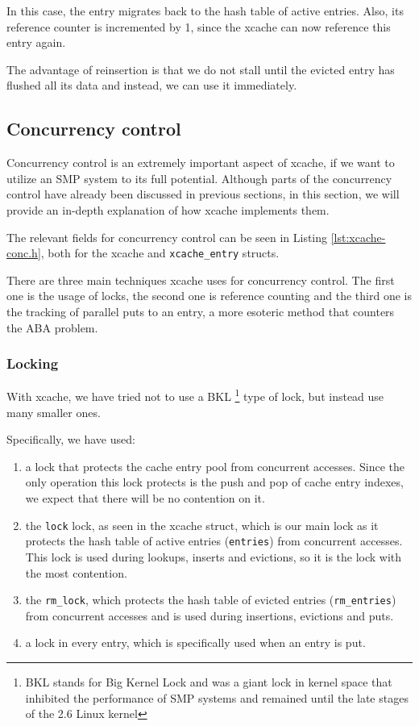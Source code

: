 In this case, the entry migrates back to the hash table of active entries.  
Also, its reference counter is incremented by 1, since the xcache can now 
reference this entry again.

The advantage of reinsertion is that we do not stall until the evicted entry 
has flushed all its data and instead, we can use it immediately.

\subsection{Concurrency control}\label{sec:xcache-conc-imp}

Concurrency control is an extremely important aspect of xcache, if we want to 
utilize an SMP system to its full potential. Although parts of the concurrency 
control have already been discussed in previous sections, in this section, we 
will provide an in-depth explanation of how xcache implements them.

The relevant fields for concurrency control can be seen in Listing 
\ref{lst:xcache-conc.h}, both for the xcache and \texttt{xcache\_entry} 
structs.


There are three main techniques xcache uses for concurrency control. The first 
one is the usage of locks, the second one is reference counting and the third 
one is the tracking of parallel puts to an entry, a more esoteric method that 
counters the ABA problem.

\subsubsection{Locking}\label{sec:xcache-lock-imp}

With xcache, we have tried not to use a BKL
\footnote{BKL stands for Big Kernel Lock and was a giant lock in kernel space 
	that inhibited the performance of SMP systems and remained until the 
	late stages of the 2.6 Linux kernel}
type of lock, but instead use many smaller ones.

Specifically, we have used:
\begin{enumerate}
	\item a lock that protects the cache entry pool from concurrent 
		accesses. Since the only operation this lock protects is the 
		push and pop of cache entry indexes, we expect that there will 
		be no contention on it.
	\item the \texttt{lock} lock, as seen in the xcache struct, which is 
		our main lock as it protects the hash table of active entries 
		(\texttt{entries}) from concurrent accesses. This lock is used 
		during lookups, inserts and evictions, so it is the lock with 
		the most contention.
	\item the \texttt{rm\_lock}, which protects the hash table of evicted 
		entries (\texttt{rm\_entries}) from concurrent accesses and is 
		used during insertions, evictions and puts.
	\item a lock in every entry, which is specifically used when an entry 
		is put.
\end{enumerate}

